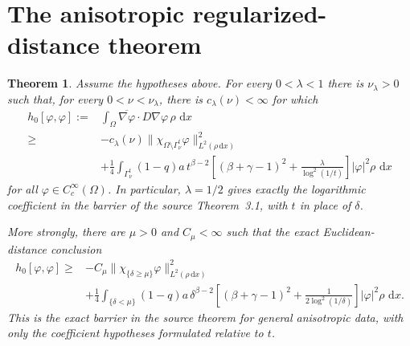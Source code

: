 \documentclass[11pt]{article}
\newtheorem{theorem}{Theorem}
\newcommand{\Om}{\Omega}
\newcommand{\dd}{\,\mathrm d}
\newcommand{\Grad}{\nabla}
\begin{document}
\section{The anisotropic regularized-distance theorem}

\begin{theorem}\label{thm:anisotropic}
Assume the hypotheses above.  For every \(0<\lambda<1\) there is
\(\nu_\lambda>0\) such that, for every \(0<\nu<\nu_\lambda\), there is
\(c_\lambda(\nu)<\infty\) for which
\begin{align}
h_0[\varphi,\varphi]
:={}&\int_\Om \overline{\Grad\varphi}\cdot
D\Grad\varphi\,\rho\,\dd x \nonumber\\
\geq{}&
-c_\lambda(\nu)
\|\chi_{\Om\setminus\Gamma_\nu^t}\varphi\|_{L^2(\rho\dd x)}^2
\nonumber\\
&+\frac14\int_{\Gamma_\nu^t}(1-q)a\,t^{\beta-2}
\left[(\beta+\gamma-1)^2+
\frac{\lambda}{\log^2(1/t)}\right]
|\varphi|^2\rho\,\dd x                                      \label{eq:main}
\end{align}
for all \(\varphi\in C_c^\infty(\Om)\).
In particular, \(\lambda=1/2\) gives exactly the logarithmic coefficient in
the barrier of the source Theorem~3.1, with \(t\) in place of \(\delta\).

More strongly, there are \(\mu>0\) and \(C_\mu<\infty\) such that the
\emph{exact Euclidean-distance conclusion}
\begin{align}
h_0[\varphi,\varphi]\geq{}&
-C_\mu\|\chi_{\{\delta\geq\mu\}}\varphi\|_{L^2(\rho\dd x)}^2
\nonumber\\
&+\frac14\int_{\{\delta<\mu\}}(1-q)a\,\delta^{\beta-2}
\left[(\beta+\gamma-1)^2+
\frac1{2\log^2(1/\delta)}\right]
|\varphi|^2\rho\,\dd x.                                  \label{eq:sharp-delta}
\end{align}
This is the exact barrier in the source theorem for general anisotropic
data, with only the coefficient hypotheses formulated relative to \(t\).
\end{theorem}
\end{document}
